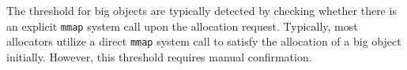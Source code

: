 The threshold for big objects are typically detected by checking whether there is an explicit \texttt{mmap} system call upon the allocation request. Typically, most allocators utilize a direct \texttt{mmap} system call to satisfy the allocation of a big object initially. However, this threshold requires manual confirmation.